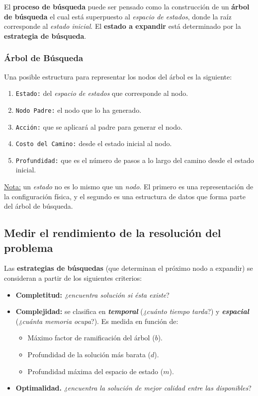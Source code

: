\documentclass[10pt,a4paper]{article}
\begin{document}
El \textbf{proceso de búsqueda} puede ser pensado como la construcción de un \textbf{árbol de búsqueda} el cual está superpuesto al \textit{espacio de estados}, donde la raíz corresponde al \textit{estado inicial}. El \textbf{estado a expandir} está determinado por la \textbf{estrategia de búsqueda}.

\subsubsection{Árbol de Búsqueda}

Una posible estructura para representar los nodos del árbol es la siguiente:
\begin{enumerate}
\item \texttt{Estado:} del \textit{espacio de estados} que corresponde al nodo.
\item \texttt{Nodo Padre:} el nodo que lo ha generado.
\item \texttt{Acción:} que se aplicará al padre para generar el nodo.
\item \texttt{Costo del Camino:} desde el estado inicial al nodo.
\item \texttt{Profundidad:} que es el número de pasos a lo largo del camino desde el estado inicial.
\end{enumerate}

\underline{Nota:} un \textit{estado} no es lo mismo que un \textit{nodo}. El primero es una representación de la configuración física, y el segundo es una estructura de datos que forma parte del árbol de búsqueda.

\subsection{Medir el rendimiento de la resolución del problema}

Las \textbf{estrategias de búsquedas} (que determinan el próximo nodo a expandir) se consideran a partir de los siguientes criterios:
\begin{itemize}
\item \textbf{Completitud:} \textit{¿encuentra solución si ésta existe}?
\item \textbf{Complejidad:} se clasifica en \textbf{\textit{temporal}} (\textit{¿cuánto tiempo tarda}?) y \textbf{\textit{espacial}} (\textit{¿cuánta memoria ocupa}?). Es medida en función de:
\begin{itemize}
\item Máximo factor de ramificación del árbol ($b$).
\item Profundidad de la solución más barata ($d$).
\item Profundidad máxima del espacio de estado ($m$).
\end{itemize}
\item \textbf{Optimalidad.} \textit{¿encuentra la solución de mejor calidad entre las disponibles}?
\end{itemize}
\end{document}
